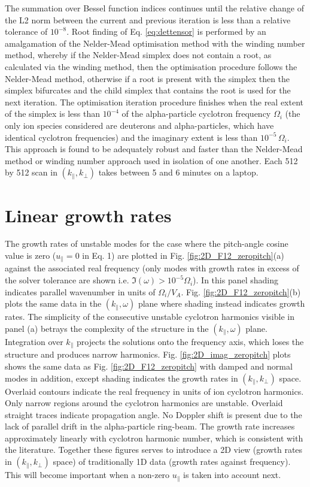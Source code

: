 \documentclass[12pt]{iopart}
\begin{document}
The summation over Bessel function indices continues until the relative change of the L2 norm between the current and previous iteration is less than a relative tolerance of $10^{-8}$. Root finding of Eq. \ref{eq:dettensor} is performed by an amalgamation of the Nelder-Mead\cite{Nelder1965} optimisation method with the winding number method, whereby if the Nelder-Mead simplex does not contain a root, as calculated via the winding method, then the optimisation procedure follows the Nelder-Mead method, otherwise if a root is present with the simplex then the simplex bifurcates and the child simplex that contains the root is used for the next iteration. The optimisation iteration procedure finishes when the real extent of the simplex is less than $10^{-4}$ of the alpha-particle cyclotron frequency $\Omega_i$ (the only ion species considered are deuterons and alpha-particles, which have identical cyclotron frequencies) and the imaginary extent is less than $10^{-5}\,\Omega_i$. This approach is found to be adequately robust and faster than the Nelder-Mead method or winding number approach used in isolation of one another. Each 512 by 512 scan in $(k_\parallel, k_\perp)$ takes between 5 and 6 minutes on a laptop.

\section{Linear growth rates}

The growth rates of unstable modes for the case where the pitch-angle cosine
value is zero ($u_\parallel = 0$ in Eq. 1) are plotted in Fig.
\ref{fig:2D_F12_zeropitch}(a) against the associated real frequency (only modes
with growth rates in excess of the solver tolerance are shown i.e. $\Im(\omega)
> 10^{-5} \Omega_i$). In this panel shading indicates parallel wavenumber in
units of $\Omega_i/V_A$. Fig. \ref{fig:2D_F12_zeropitch}(b) plots the same data in the $(k_\parallel,\omega)$ plane where shading instead indicates growth rates. The simplicity of the consecutive unstable cyclotron harmonics visible in panel (a) betrays the complexity of the structure in the $(k_\parallel, \omega)$ plane. Integration over $k_\parallel$ projects the solutions onto the frequency axis, which loses the structure and produces narrow harmonics. Fig. \ref{fig:2D_imag_zeropitch} plots shows the same data as Fig. \ref{fig:2D_F12_zeropitch} with damped and normal modes in addition, except shading indicates the growth rates in $(k_\parallel, k_\perp)$ space. Overlaid contours indicate the real frequency in units of ion cyclotron harmonics. Only narrow regions around the cyclotron harmonics are unstable. Overlaid straight traces indicate propagation angle. No Doppler shift is present due to the lack of parallel drift in the alpha-particle ring-beam. The growth rate increases approximately linearly with cyclotron harmonic number, which is consistent with the literature\cite{Dendy1994}. Together these figures serves to introduce a 2D view (growth rates in $(k_\parallel, k_\perp)$ space) of traditionally 1D data (growth rates against frequency). This will become important when a non-zero $u_\parallel$ is taken into account next.
\end{document}
